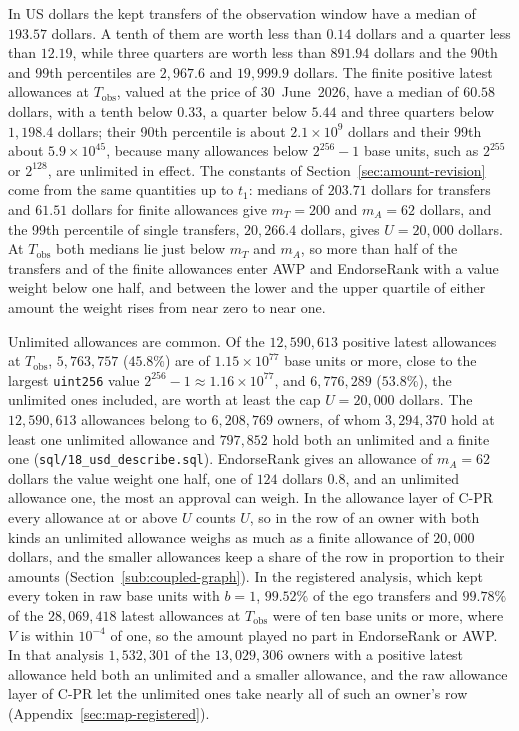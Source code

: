 In US dollars the kept transfers of the observation window have a median of $193.57$ dollars. A tenth of them are worth less than $0.14$ dollars and a quarter less than $12.19$, while three quarters are worth less than $891.94$ dollars and the 90th and 99th percentiles are $2{,}967.6$ and $19{,}999.9$ dollars. The finite positive latest allowances at $T_{\text{obs}}$, valued at the price of 30~June~2026, have a median of $60.58$ dollars, with a tenth below $0.33$, a quarter below $5.44$ and three quarters below $1{,}198.4$ dollars; their 90th percentile is about $2.1\times10^{9}$ dollars and their 99th about $5.9\times10^{45}$, because many allowances below $2^{256}-1$ base units, such as $2^{255}$ or $2^{128}$, are unlimited in effect. The constants of Section~\ref{sec:amount-revision} come from the same quantities up to $t_1$: medians of $203.71$ dollars for transfers and $61.51$ dollars for finite allowances give $m_T=200$ and $m_A=62$ dollars, and the 99th percentile of single transfers, $20{,}266.4$ dollars, gives $U=20{,}000$ dollars. At $T_{\text{obs}}$ both medians lie just below $m_T$ and $m_A$, so more than half of the transfers and of the finite allowances enter AWP and EndorseRank with a value weight below one half, and between the lower and the upper quartile of either amount the weight rises from near zero to near one.

Unlimited allowances are common. Of the $12{,}590{,}613$ positive latest allowances at $T_{\text{obs}}$, $5{,}763{,}757$ ($45.8\%$) are of $1.15\times10^{77}$ base units or more, close to the largest \texttt{uint256} value $2^{256}-1\approx1.16\times10^{77}$, and $6{,}776{,}289$ ($53.8\%$), the unlimited ones included, are worth at least the cap $U=20{,}000$ dollars. The $12{,}590{,}613$ allowances belong to $6{,}208{,}769$ owners, of whom $3{,}294{,}370$ hold at least one unlimited allowance and $797{,}852$ hold both an unlimited and a finite one (\texttt{sql/18\_usd\_describe.sql}). EndorseRank gives an allowance of $m_A=62$ dollars the value weight one half, one of $124$ dollars $0.8$, and an unlimited allowance one, the most an approval can weigh. In the allowance layer of C-PR every allowance at or above $U$ counts $U$, so in the row of an owner with both kinds an unlimited allowance weighs as much as a finite allowance of $20{,}000$ dollars, and the smaller allowances keep a share of the row in proportion to their amounts (Section~\ref{sub:coupled-graph}). In the registered analysis, which kept every token in raw base units with $b=1$, $99.52\%$ of the ego transfers and $99.78\%$ of the $28{,}069{,}418$ latest allowances at $T_{\text{obs}}$ were of ten base units or more, where $V$ is within $10^{-4}$ of one, so the amount played no part in EndorseRank or AWP. In that analysis $1{,}532{,}301$ of the $13{,}029{,}306$ owners with a positive latest allowance held both an unlimited and a smaller allowance, and the raw allowance layer of C-PR let the unlimited ones take nearly all of such an owner's row (Appendix~\ref{sec:map-registered}).

